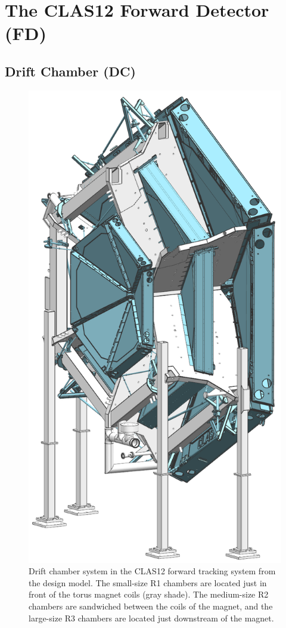 \documentclass[final,3p,twocolumn]{elsarticle}
\begin{document}
\section{The CLAS12 Forward Detector (FD)}

\subsection{Drift Chamber (DC)}
\begin{figure}[ht!]
\centerline{\includegraphics[width=0.60\columnwidth]{dc-view-4.png}}
\caption{Drift chamber system in the CLAS12 forward tracking system from the design model. The small-size R1
  chambers are located just in front of the torus magnet coils (gray shade). The medium-size R2 chambers are
  sandwiched between the coils of the magnet, and the large-size R3 chambers are located just downstream of the
  magnet.}
\label{clas12-dc}
\end{figure}
\end{document}
